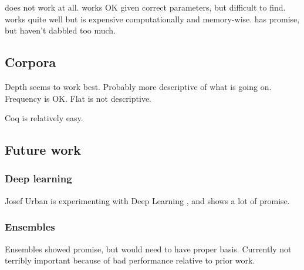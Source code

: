 \knnadaptive does not work at all.
\nb works OK given correct parameters, but difficult to find.
\adarank works quite well but is expensive computationally and memory-wise.
\ensemble has promise, but haven't dabbled too much.

\subsection{Corpora}
Depth seems to work best. Probably more descriptive of what is going on.
Frequency is OK.
Flat is not descriptive.

Coq is relatively easy.

\subsection{Future work}
\subsubsection{Deep learning}
Josef Urban is experimenting with Deep Learning \cite{loos2017deep}, and shows a lot of promise.

\subsubsection{Ensembles}
Ensembles showed promise, but would need to have proper basis.
Currently not terribly important because of bad performance relative to prior work.

